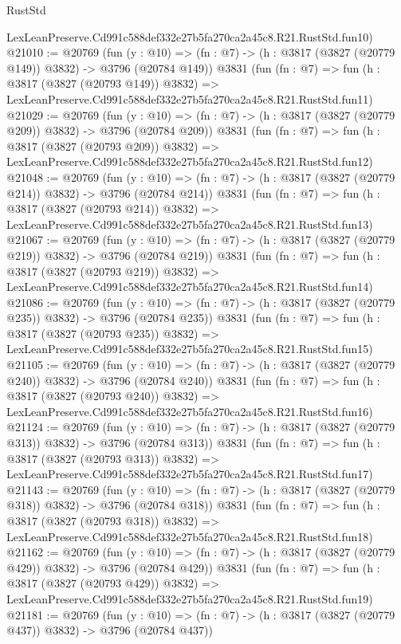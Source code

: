 \begin{lexlean}{RustStd}
\begin{coremodule}
    LexLeanPreserve.Cd991c588def332e27b5fa270ca2a45c8.R21.RustStd.fun10)
@21010 := @20769
    (fun (y : @10) => (fn : @7) -> (h : @3817 (@3827 (@20779 @149)) @3832) -> @3796 (@20784 @149))
    @3831
    (fun (fn : @7) =>
    fun (h : @3817 (@3827 (@20793 @149)) @3832) =>
    LexLeanPreserve.Cd991c588def332e27b5fa270ca2a45c8.R21.RustStd.fun11)
@21029 := @20769
    (fun (y : @10) => (fn : @7) -> (h : @3817 (@3827 (@20779 @209)) @3832) -> @3796 (@20784 @209))
    @3831
    (fun (fn : @7) =>
    fun (h : @3817 (@3827 (@20793 @209)) @3832) =>
    LexLeanPreserve.Cd991c588def332e27b5fa270ca2a45c8.R21.RustStd.fun12)
@21048 := @20769
    (fun (y : @10) => (fn : @7) -> (h : @3817 (@3827 (@20779 @214)) @3832) -> @3796 (@20784 @214))
    @3831
    (fun (fn : @7) =>
    fun (h : @3817 (@3827 (@20793 @214)) @3832) =>
    LexLeanPreserve.Cd991c588def332e27b5fa270ca2a45c8.R21.RustStd.fun13)
@21067 := @20769
    (fun (y : @10) => (fn : @7) -> (h : @3817 (@3827 (@20779 @219)) @3832) -> @3796 (@20784 @219))
    @3831
    (fun (fn : @7) =>
    fun (h : @3817 (@3827 (@20793 @219)) @3832) =>
    LexLeanPreserve.Cd991c588def332e27b5fa270ca2a45c8.R21.RustStd.fun14)
@21086 := @20769
    (fun (y : @10) => (fn : @7) -> (h : @3817 (@3827 (@20779 @235)) @3832) -> @3796 (@20784 @235))
    @3831
    (fun (fn : @7) =>
    fun (h : @3817 (@3827 (@20793 @235)) @3832) =>
    LexLeanPreserve.Cd991c588def332e27b5fa270ca2a45c8.R21.RustStd.fun15)
@21105 := @20769
    (fun (y : @10) => (fn : @7) -> (h : @3817 (@3827 (@20779 @240)) @3832) -> @3796 (@20784 @240))
    @3831
    (fun (fn : @7) =>
    fun (h : @3817 (@3827 (@20793 @240)) @3832) =>
    LexLeanPreserve.Cd991c588def332e27b5fa270ca2a45c8.R21.RustStd.fun16)
@21124 := @20769
    (fun (y : @10) => (fn : @7) -> (h : @3817 (@3827 (@20779 @313)) @3832) -> @3796 (@20784 @313))
    @3831
    (fun (fn : @7) =>
    fun (h : @3817 (@3827 (@20793 @313)) @3832) =>
    LexLeanPreserve.Cd991c588def332e27b5fa270ca2a45c8.R21.RustStd.fun17)
@21143 := @20769
    (fun (y : @10) => (fn : @7) -> (h : @3817 (@3827 (@20779 @318)) @3832) -> @3796 (@20784 @318))
    @3831
    (fun (fn : @7) =>
    fun (h : @3817 (@3827 (@20793 @318)) @3832) =>
    LexLeanPreserve.Cd991c588def332e27b5fa270ca2a45c8.R21.RustStd.fun18)
@21162 := @20769
    (fun (y : @10) => (fn : @7) -> (h : @3817 (@3827 (@20779 @429)) @3832) -> @3796 (@20784 @429))
    @3831
    (fun (fn : @7) =>
    fun (h : @3817 (@3827 (@20793 @429)) @3832) =>
    LexLeanPreserve.Cd991c588def332e27b5fa270ca2a45c8.R21.RustStd.fun19)
@21181 := @20769
    (fun (y : @10) => (fn : @7) -> (h : @3817 (@3827 (@20779 @437)) @3832) -> @3796 (@20784 @437))

\end{coremodule}
\end{lexlean}
